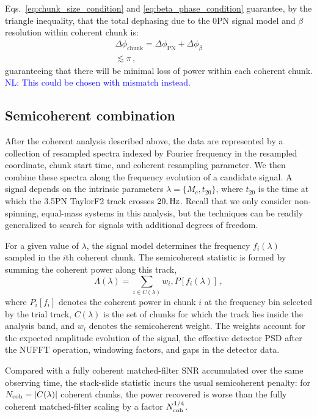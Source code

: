 \documentclass[aps,prd,amsmath,floats,floatfix, twocolumn,
superscriptaddress,nofootinbib,showpacs]{revtex4-2}
\newcommand{\nl}[1]{\textcolor{blue}{NL: #1}}
\begin{document}
Eqs.~\eqref{eq:chunk_size_condition} and \eqref{eq:beta_phase_condition}
guarantee, by the triangle inequality, that the total dephasing due to the 0PN signal model and $\beta$ resolution within coherent chunk is:
\begin{gather}
    \Delta\phi_\mathrm{chunk} = \Delta\phi_\mathrm{PN}+\Delta\phi_\beta \\
    \lesssim\pi \, ,
\end{gather} 
guaranteeing that there will be minimal loss of power within each coherent chunk. 
\nl{This could be chosen with mismatch instead.}

\subsection{Semicoherent combination}
After the coherent analysis described above, the data are represented by a
collection of resampled spectra indexed by Fourier frequency in 
the resampled coordinate, chunk start time, and coherent resampling
parameter. We then combine these spectra along the frequency evolution of a
candidate signal. A signal depends on the intrinsic parameters
$\lambda = \{M_c, t_{20}\}$, where $t_{20}$ is the time at which the 3.5PN
TaylorF2 track crosses $20,{\rm Hz}$. Recall that we only consider
non-spinning, equal-mass systems in this analysis, but the techniques can
be readily generalized to search for signals with additional degrees of
freedom.

For a given value of $\lambda$, the signal model determines the frequency
$f_i(\lambda)$ sampled in the $i$th coherent chunk. The semicoherent statistic
is formed by summing the coherent power along this track,
\begin{equation}
\Lambda(\lambda)
=
\sum_{i\in C(\lambda)}
w_i,P\left[f_i(\lambda)\right] \, ,
\label{eq:stack_slide_statistic}
\end{equation}
where $P_i[f_i]$ denotes the coherent power in chunk $i$ at the frequency bin
selected by the trial track, $C(\lambda)$ is the set of chunks for which the
track lies inside the analysis band, and $w_i$ denotes the semicoherent weight.
The weights account for the expected amplitude evolution of the signal, the
effective detector PSD after the NUFFT operation, windowing factors, and gaps in
the detector data. 

Compared with a fully coherent matched-filter SNR accumulated over the
same observing time, the stack-slide statistic incurs the usual semicoherent
penalty: for $N_{\rm coh} = |C(\lambda)|$ coherent chunks, the power recovered 
is worse than the fully coherent matched-filter scaling by a factor
$N_{\rm coh}^{1/4}$.
\end{document}
